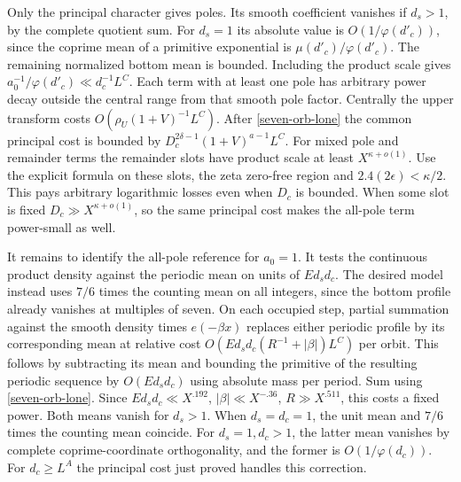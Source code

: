 \documentclass[11pt,a4paper]{article}
\theoremstyle{paperplain}
\numberwithin{equation}{section}
\begin{document}
Only the principal character gives poles. Its smooth coefficient
vanishes if \(d_s>1\), by the complete quotient sum. For \(d_s=1\)
its absolute value is \(O(1/\varphi(d'_c))\), since the coprime
mean of a primitive exponential is \(\mu(d'_c)/\varphi(d'_c)\).
The remaining normalized bottom mean is bounded. Including the
product scale gives
\(a_0^{-1}/\varphi(d'_c)\ll d_c^{-1}L^C\).
Each term with at least one pole has arbitrary power decay outside
the central range from that smooth pole factor. Centrally the
upper transform costs \(O(\rho_U (1+V)^{-1}L^C)\).
After \eqref{seven-orb-lone} the common principal cost is bounded by
\(D_c^{2\delta-1}(1+V)^{a-1}L^C\).
For mixed pole and remainder terms the remainder slots have product
scale at least \(X^{\kappa+o(1)}\). Use the explicit formula on these
slots, the zeta zero-free region and \(2.4(2\epsilon)<\kappa/2\).
This pays arbitrary logarithmic losses even when \(D_c\) is bounded.
When some slot is fixed \(D_c\gg X^{\kappa+o(1)}\), so the same
principal cost makes the all-pole term power-small as well.

It remains to identify the all-pole reference for \(a_0=1\).
It tests the continuous product density against the periodic mean
on units of \(Ed_sd_c\). The desired model instead uses \(7/6\)
times the counting mean on all integers, since the bottom profile already
vanishes at multiples of seven. On each occupied step, partial
summation against the smooth density times \(e(-\beta x)\) replaces
either periodic profile by its corresponding mean at relative cost
\(O(Ed_sd_c(R^{-1}+|\beta|)L^C)\) per orbit. This follows by
subtracting its mean and bounding the primitive of the resulting
periodic sequence by \(O(Ed_sd_c)\) using absolute mass per period.
Sum using \eqref{seven-orb-lone}. Since \(Ed_sd_c\ll X^{.192}\),
\(|\beta|\ll X^{-.36}\), \(R\gg X^{.511}\), this costs a fixed power.
Both means vanish for \(d_s>1\). When \(d_s=d_c=1\), the unit mean
and \(7/6\) times the counting mean coincide. For \(d_s=1,d_c>1\),
the latter mean vanishes by complete coprime-coordinate orthogonality,
and the former is \(O(1/\varphi(d_c))\). For \(d_c\ge L^A\) the
principal cost just proved handles this correction.
\end{document}
